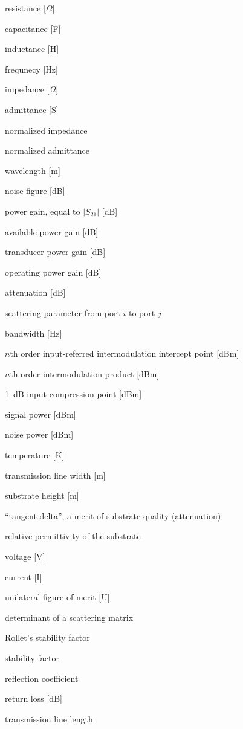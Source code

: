 \documentclass[a4paper, 12pt]{article}
\begin{document}
	\begin{description}[font=\rmfamily\mdseries, leftmargin=25.5mm, style=sameline, align=right, labelsep=5mm, itemsep=-2pt]
		\item[$R$]						resistance [$\Omega$]
		\item[$C$]						capacitance [F]
		\item[$L$]						inductance [H]
		\item[$f$] 						frequnecy [Hz]
		\item[$Z$] 						impedance [$\Omega$]
		\item[$Y$] 						admittance [S]
		\item[$z$] 						normalized impedance
		\item[$y$] 						normalized admittance
		\item[$\lambda$] 				wavelength [m]
		\item[$F$] 						noise figure [dB]
		\item[$G_0$] 					power gain, equal to $|S_{21}|$ [dB]
		\item[$G_\mathrm{A}$] 			available power gain [dB]
		\item[$G_\mathrm{T}$] 			transducer power gain [dB]
		\item[$G_\mathrm{P}$] 			operating power gain [dB]
		\item[$L$] 						attenuation [dB]
		\item[$S_{ij}$] 				scattering parameter from port $i$ to port $j$
		\item[$\mathit{BW}$] 			bandwidth [Hz]
		\item[$\mathit{IIP}_n$] 		$n$th order input-referred intermodulation intercept point [dBm]
		\item[$\mathit{IM}_n$] 			$n$th order intermodulation product [dBm]
		\item[$\mathit{ICP}$] 			1~dB input compression point [dBm]
		\item[$P$] 						signal power [dBm]
		\item[$N$] 						noise power [dBm]
		\item[$T$] 						temperature [K]
		\item[$w$] 						transmission line width [m]
		\item[$h$] 						substrate height [m]
		\item[$\tan \delta$]			``tangent delta'', a merit of substrate quality (attenuation)
		\item[$\epsilon_\mathrm{r}$]	relative permittivity of the substrate
		\item[$V$]						voltage [V]
		\item[$I$]						current [I]
		\item[$U$]						unilateral figure of merit [U]
		\item[$\Delta$]					determinant of a scattering matrix
		\item[$K$]						Rollet's stability factor
		\item[$\mu$]					stability factor
		\item[$\rho$]					reflection coefficient
		\item[$\textit{RL}$] 			return loss [dB]
		\item[$l$]						transmission line length
	\end{description}
\end{document}
